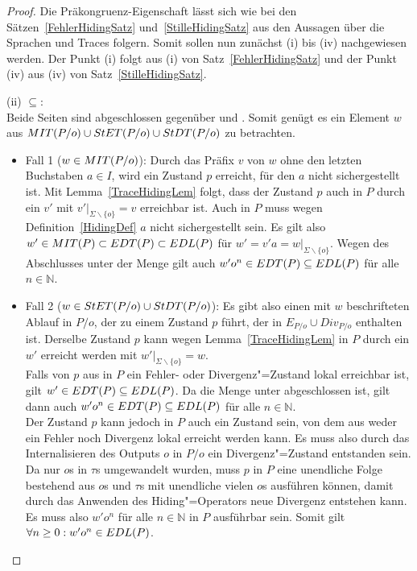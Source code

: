 \begin{proof}
  Die Präkongruenz-Eigenschaft lässt sich wie bei den
  Sätzen~\ref{FehlerHidingSatz} und~\ref{StilleHidingSatz} aus den Aussagen
  über die Sprachen und Traces folgern. Somit sollen nun zunächst (i) bis (iv)
  nachgewiesen werden. Der Punkt (i) folgt aus (i) von
  Satz~\ref{FehlerHidingSatz} und der Punkt (iv) aus (iv) von
  Satz~\ref{StilleHidingSatz}.

  (ii) \glqq $\subseteq$\grqq{}:\\
  Beide Seiten sind abgeschlossen gegenüber \prune{} und \cont{}. Somit genügt
  es ein Element $w$ aus $MIT (P/o)\cup StET (P/o)\cup StDT (P/o)$ zu
  betrachten.
  \begin{itemize}
    \item Fall 1 ($w\in MIT (P/o)$): Durch das Präfix $v$ von $w$ ohne den
      letzten Buchstaben $a\in I$, wird ein Zustand $p$ erreicht, für den $a$
      nicht sichergestellt ist. Mit Lemma~\ref{TraceHidingLem} folgt, dass der
      Zustand $p$ auch in $P$ durch ein $v'$ mit $v'|_{\Sigma\backslash\{o\}} =
      v$ erreichbar ist. Auch in $P$ muss wegen Definition~\ref{HidingDef} $a$
      nicht sichergestellt sein. Es gilt also $w'\in MIT (P) \subset EDT (P)
      \subset EDL (P)$ für $w' = v'a = w|_{\Sigma\backslash\{o\}}$. Wegen des
      Abschlusses unter \cont{} der Menge \EDT{} gilt auch $w'o^n\in EDT
      (P)\subseteq EDL (P)$ für alle $n\in\mathbb{N}$.
    \item Fall 2 ($w\in StET (P/o)\cup StDT (P/o)$): Es gibt also einen mit
      $w$ beschrifteten Ablauf in $P/o$, der zu einem Zustand $p$ führt, der in
      $E_{P/o}\cup Div_{P/o}$ enthalten ist. Derselbe Zustand $p$ kann wegen
      Lemma~\ref{TraceHidingLem} in $P$ durch ein $w'$ erreicht werden mit
      $w'|_{\Sigma\backslash\{o\}} = w$.\\
      Falls von $p$ aus in $P$ ein Fehler- oder Divergenz"=Zustand lokal
      erreichbar ist, gilt $w'\in EDT (P)\subseteq EDL (P)$. Da die Menge
      \EDT{} unter \cont{} abgeschlossen ist, gilt dann auch $w'o^n\in EDT
      (P)\subseteq EDL (P)$ für alle $n\in\mathbb{N}$.\\
      Der Zustand $p$ kann jedoch in $P$ auch ein Zustand sein, von dem aus
      weder ein Fehler noch Divergenz lokal erreicht werden kann. Es muss also
      durch das Internalisieren des Outputs $o$ in $P/o$ ein Divergenz"=Zustand
      entstanden sein. Da nur $o$s in $\tau$s umgewandelt wurden, muss $p$ in
      $P$ eine unendliche Folge bestehend aus $o$s und $\tau$s mit unendliche
      vielen $o$s ausführen können, damit durch das Anwenden des
      Hiding"=Operators neue Divergenz entstehen kann. Es muss also $w'o^n$ für
      alle $n\in\mathbb{N}$ in $P$ ausführbar sein. Somit gilt $\forall n\geq
      0: w'o^n\in EDL (P)$.
  \end{itemize}


\end{proof}
